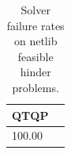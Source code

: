 \begin{table}
\caption{Solver failure rates on netlib feasible hinder problems.}
\label{t-netlib feasible hinder-failure}
\begin{tabular}{lc}
\toprule
QTQP \\
\midrule
100.00 \\
\bottomrule
\end{tabular}
\end{table}
